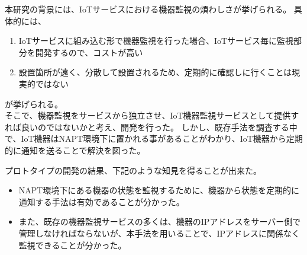 \begin{comment}
IoTとは、様々なモノにコンピュータを取り付け、インターネットを介して相互に情報をやり取りすることで、様々な自動化を図ろうという概念である。
IoTサービスとは、IoTによる利便性をユーザーに提供するもので、IoT機器とサーバーのプログラムがインターネットを介して通信し合うことで成り立っている。
そのため、IoTサービスの円滑な提供のために、IoT機器の監視は不可欠である。

しかし、IoT機器が多量に存在することや、IoT機器が接続するネットワークが多様であることから、IoT機器の監視には技術的困難がある。
IoTサービスでは、多量のIoT機器を使用するため、個々のIoT機器を識別し、適切に管理することは難しい。
また、IoT






\end{comment}







本研究の背景には、IoTサービスにおける機器監視の煩わしさが挙げられる。
具体的には、
\begin{enumerate}
	\item IoTサービスに組み込む形で機器監視を行った場合、IoTサービス毎に監視部分を開発するので、コストが高い
	\item 設置箇所が遠く、分散して設置されるため、定期的に確認しに行くことは現実的ではない
\end{enumerate}
が挙げられる。\\

そこで、機器監視をサービスから独立させ、IoT機器監視サービスとして提供すれば良いのではないかと考え、開発を行った。
しかし、既存手法を調査する中で、IoT機器はNAPT環境下に置かれる事があることがわかり、IoT機器から定期的に通知を送ることで解決を図った。

プロトタイプの開発の結果、下記のような知見を得ることが出来た。
\begin{itemize}
	\item NAPT環境下にある機器の状態を監視するために、機器から状態を定期的に通知する手法は有効であることが分かった。
	\item また、既存の機器監視サービスの多くは、機器のIPアドレスをサーバー側で管理しなければならないが、本手法を用いることで、IPアドレスに関係なく監視できることが分かった。
\end{itemize}


